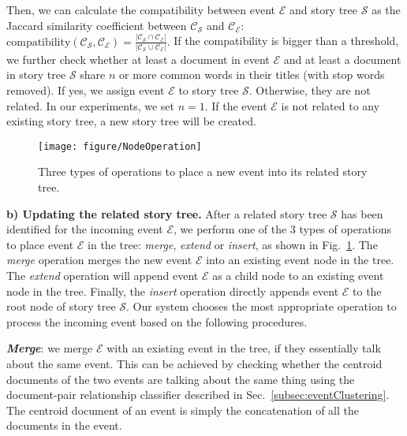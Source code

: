 Then, we can calculate the compatibility between event $\mathcal{E}$ and story tree $\mathcal{S}$ as the Jaccard similarity coefficient between $\mathcal{C}_{\mathcal{S}}$ and $\mathcal{C}_{\mathcal{E}}$: 
$
  \text{compatibility}(\mathcal{C}_{\mathcal{S}}, \mathcal{C}_{\mathcal{E}}) = \frac{|\mathcal{C}_{\mathcal{S}} \cap \mathcal{C}_{\mathcal{E}}|}{|\mathcal{C}_{\mathcal{S}} \cup \mathcal{C}_{\mathcal{E}}|}.
$
If the compatibility is bigger than a threshold, we further check whether at least a document in event $\mathcal{E}$ and at least a document in story tree $\mathcal{S}$ share $n$ or more common words in their titles (with stop words removed). If yes, we assign event $\mathcal{E}$ to story tree $\mathcal{S}$. Otherwise, they are not related. In our experiments, we set $n=1$. 
If the event $\mathcal{E}$ is not related to any existing story tree, a new story tree will be created.


\begin{figure}
\texttt{[image: figure/NodeOperation]}
\caption{Three types of operations to place a new event into its related story tree.}
\label{fig:nodeOperations}
\vspace{-2mm}
\end{figure}

{\bf b) Updating the related story tree.} After a related story tree $\mathcal{S}$ has been identified for the incoming event $\mathcal{E}$, we perform one of the 3 types of operations to place event $\mathcal{E}$ in the tree: \textit{merge}, \textit{extend} or \textit{insert}, as shown in Fig.~\ref{fig:nodeOperations}.
The \textit{merge} operation merges the new event $\mathcal{E}$ into an existing event node in the tree. The \textit{extend} operation will append event $\mathcal{E}$ as a child node to an existing event node in the tree. Finally, the \textit{insert} operation directly appends event $\mathcal{E}$ to the root node of story tree $\mathcal{S}$. Our system chooses the most appropriate operation to process the incoming event based on the following procedures.

{\bf \emph{Merge}}: we merge $\mathcal{E}$ with an existing event in the tree, if they essentially talk about the same event.
This can be achieved by checking whether the centroid documents of the two events are talking about the same thing using the document-pair relationship classifier described in Sec.~\ref{subsec:eventClustering}. The centroid document of an event is simply the concatenation of all the documents in the event.

